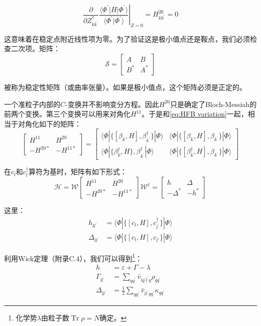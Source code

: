 \begin{equation}
\frac{\partial}{\partial Z^{*}_{kk^{\prime}}}\left.\frac{\langle\Phi^{\prime}|H|\Phi^{\prime}\rangle}{\langle\Phi^{\prime}|\Phi^{\prime}\rangle}\right|_{Z=0}=H^{20}_{kk^{\prime}}=0\label{eq:HFB variation}
\end{equation}

这意味着在稳定点附近线性项为零。为了验证这是极小值点还是鞍点，我们必须检查二次项。矩阵：
\[
\mathscr{S}=\begin{bmatrix}A & B\\
B^{*} & A^{*}
\end{bmatrix}
\]

被称为稳定性矩阵（或曲率张量）。如果是极小值点，这个矩阵必须是正定的。

一个准粒子内部的$C$-变换并不影响变分方程。因此$H^{20}$只是确定了Bloch-Messiah的前两个变换。第三个变换可以用来对角化$H^{11}$。于是和\ref{eq:HFB variation}一起，相当于对角化如下的矩阵：
\[
\begin{bmatrix}H^{11} & H^{20}\\
-H^{20*} & -H^{11*}
\end{bmatrix}=\begin{bmatrix}\langle\Phi|\{[\beta_{k},H],\beta^{\dagger}_{k^{\prime}}\}|\Phi\rangle & \langle\Phi|\{[\beta_{k},H],\beta_{k^{\prime}}\}|\Phi\rangle\\
\langle\Phi|\{\beta^{\dagger}_{k},H\},\beta^{\dagger}_{k^{\prime}}|\Phi\rangle & \langle\Phi|\{[\beta^{\dagger}_{k},H],\beta_{k^{\prime}}\}|\Phi\rangle
\end{bmatrix}
\]

在$c_{l}$和$c^{\dagger}_{l}$算符为基时，矩阵有如下形式：
\[
\mathcal{H}=\mathcal{W}\begin{bmatrix}H^{11} & H^{20}\\
-H^{20*} & -H^{11*}
\end{bmatrix}\mathcal{W}^{\dagger}=\begin{bmatrix}h & \Delta\\
-\Delta^{*} & -h^{*}
\end{bmatrix}
\]

这里：
\begin{align*}
h_{ll^{\prime}} & =\langle\Phi|\{[c_{l},H],c^{\dagger}_{l^{\prime}}\}|\Phi\rangle\\
\Delta_{ll^{\prime}} & =\langle\Phi|\{[c_{l},H],c_{l^{\prime}}\}|\Phi\rangle
\end{align*}

利用Wick定理（附录C.4），我们可以得到\footnote{化学势$\lambda$由粒子数$\mathop{\text{Tr}}\rho=N$确定。}：
\begin{align}
h & =\varepsilon+\Gamma-\lambda\nonumber \\
\Gamma_{ll^{\prime}} & =\sum_{qq^{\prime}}\bar{v}_{lq^{\prime}l^{\prime}q}\rho_{qq^{\prime}}\label{eq:=005355=007C92=005B50Hamilton=0091CF=004E0E=005BF9=005BC6=005EA6}\\
\Delta_{ll^{\prime}} & =\frac{1}{2}\sum_{qq^{\prime}}\bar{v}_{ll^{\prime}qq^{\prime}}\kappa_{qq^{\prime}}\nonumber 
\end{align}

